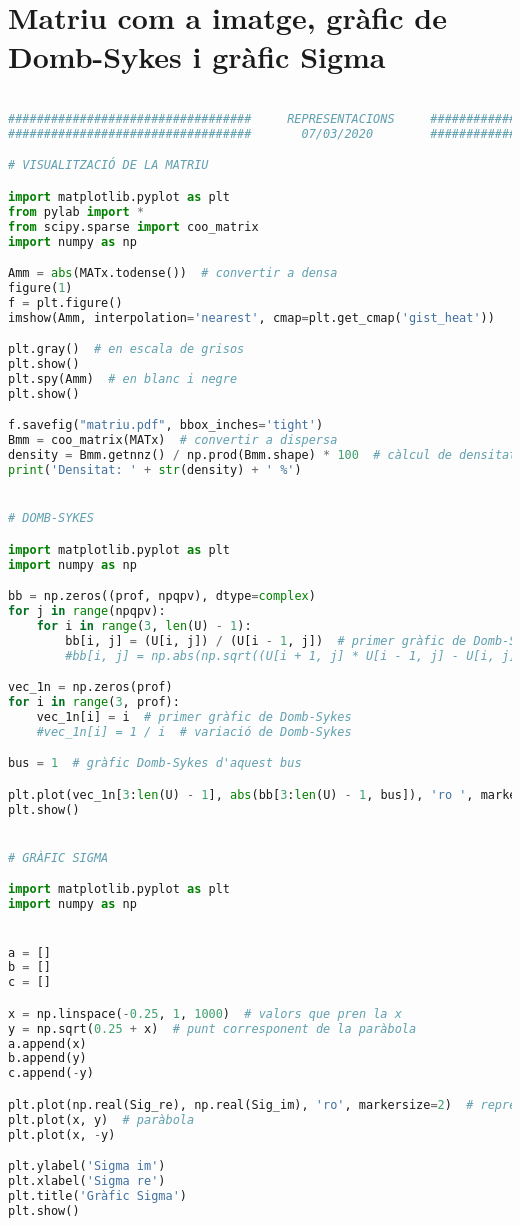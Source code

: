 \section{Matriu com a imatge, gràfic de Domb-Sykes i gràfic Sigma}
\begin{lstlisting}[language=Python,numbers=none]

##################################     REPRESENTACIONS     ###################################
##################################       07/03/2020        ###################################

# VISUALITZACIÓ DE LA MATRIU

import matplotlib.pyplot as plt
from pylab import *
from scipy.sparse import coo_matrix
import numpy as np

Amm = abs(MATx.todense())  # convertir a densa
figure(1)
f = plt.figure()
imshow(Amm, interpolation='nearest', cmap=plt.get_cmap('gist_heat'))

plt.gray()  # en escala de grisos
plt.show()
plt.spy(Amm)  # en blanc i negre
plt.show()

f.savefig("matriu.pdf", bbox_inches='tight')
Bmm = coo_matrix(MATx)  # convertir a dispersa
density = Bmm.getnnz() / np.prod(Bmm.shape) * 100  # càlcul de densitat
print('Densitat: ' + str(density) + ' %')


# DOMB-SYKES

import matplotlib.pyplot as plt
import numpy as np

bb = np.zeros((prof, npqpv), dtype=complex)
for j in range(npqpv):
    for i in range(3, len(U) - 1):
        bb[i, j] = (U[i, j]) / (U[i - 1, j])  # primer gràfic de Domb-Sykes
        #bb[i, j] = np.abs(np.sqrt((U[i + 1, j] * U[i - 1, j] - U[i, j] ** 2) / (U[i, j] * U[i - 2, j] - U[i - 1, j] ** 2)))  # variació de Domb-Sykes

vec_1n = np.zeros(prof)
for i in range(3, prof):
    vec_1n[i] = i  # primer gràfic de Domb-Sykes
    #vec_1n[i] = 1 / i  # variació de Domb-Sykes

bus = 1  # gràfic Domb-Sykes d'aquest bus

plt.plot(vec_1n[3:len(U) - 1], abs(bb[3:len(U) - 1, bus]), 'ro ', markersize=2)
plt.show()


# GRÀFIC SIGMA

import matplotlib.pyplot as plt
import numpy as np


a = []
b = []
c = []

x = np.linspace(-0.25, 1, 1000)  # valors que pren la x
y = np.sqrt(0.25 + x)  # punt corresponent de la paràbola
a.append(x)
b.append(y)
c.append(-y)

plt.plot(np.real(Sig_re), np.real(Sig_im), 'ro', markersize=2)  # representació dels punts de Sigma
plt.plot(x, y)  # paràbola
plt.plot(x, -y)

plt.ylabel('Sigma im')
plt.xlabel('Sigma re')
plt.title('Gràfic Sigma')
plt.show()
\end{lstlisting}

